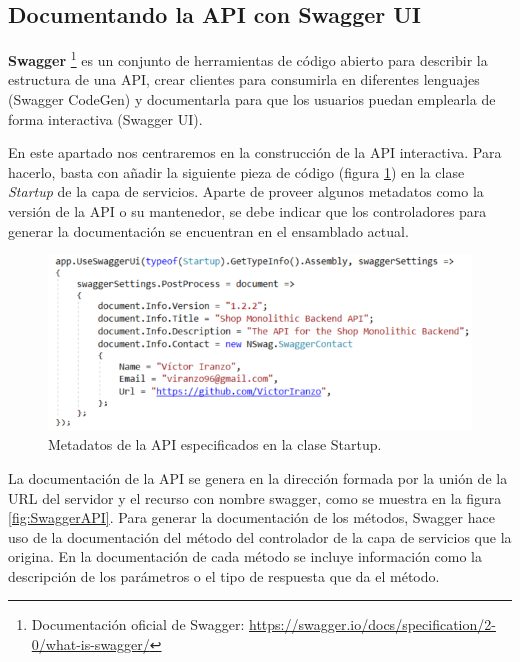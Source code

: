 \documentclass[11pt,spanish,listoffigures]{tfgetsinf}
\begin{document}
\subsection{Documentando la API con Swagger UI}

\textbf{Swagger} \footnote{ Documentación oficial de Swagger: \url{https://swagger.io/docs/specification/2-0/what-is-swagger/}} es un conjunto de herramientas de código abierto para describir la estructura de una API, crear clientes para consumirla en diferentes lenguajes (Swagger CodeGen) y documentarla para que los usuarios puedan emplearla de forma interactiva (Swagger UI).

En este apartado nos centraremos en la construcción de la API interactiva. Para hacerlo, basta con añadir la siguiente pieza de código (figura \ref{fig:SwaggerUI}) en la clase \textit{Startup} de la capa de servicios. Aparte de proveer algunos metadatos como la versión de la API o su mantenedor, se debe indicar que los controladores para generar la documentación se encuentran en el ensamblado actual.

\begin{figure}[h]
\centering
\includegraphics[scale=0.9]{SwaggerUI}
\caption{Metadatos de la API especificados en la clase Startup.}
\label{fig:SwaggerUI}
\end{figure}

La documentación de la API se genera en la dirección formada por la unión de la URL del servidor y el recurso con nombre swagger, como se muestra en la figura \ref{fig:SwaggerAPI}. Para generar la documentación de los métodos, Swagger hace uso de la documentación del método del controlador de la capa de servicios que la origina. En la documentación de cada método se incluye información como la descripción de los parámetros o el tipo de respuesta que da el método.
\end{document}
